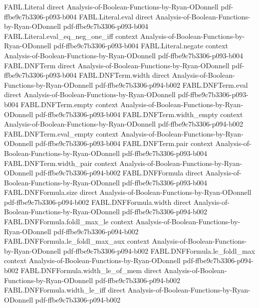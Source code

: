 \begin{theorem}
\proofstep
  {FABL.Literal}
  {direct}
  {Analysis-of-Boolean-Functions-by-Ryan-ODonnell}
  {pdf-ffbe9c7b3306-p093-b004}
\proofstep
  {FABL.Literal.eval}
  {direct}
  {Analysis-of-Boolean-Functions-by-Ryan-ODonnell}
  {pdf-ffbe9c7b3306-p093-b004}
\proofstep
  {FABL.Literal.eval_eq_neg_one_iff}
  {context}
  {Analysis-of-Boolean-Functions-by-Ryan-ODonnell}
  {pdf-ffbe9c7b3306-p093-b004}
\proofstep
  {FABL.Literal.negate}
  {context}
  {Analysis-of-Boolean-Functions-by-Ryan-ODonnell}
  {pdf-ffbe9c7b3306-p093-b004}
\proofstep
  {FABL.DNFTerm}
  {direct}
  {Analysis-of-Boolean-Functions-by-Ryan-ODonnell}
  {pdf-ffbe9c7b3306-p093-b004}
\proofstep
  {FABL.DNFTerm.width}
  {direct}
  {Analysis-of-Boolean-Functions-by-Ryan-ODonnell}
  {pdf-ffbe9c7b3306-p094-b002}
\proofstep
  {FABL.DNFTerm.eval}
  {direct}
  {Analysis-of-Boolean-Functions-by-Ryan-ODonnell}
  {pdf-ffbe9c7b3306-p093-b004}
\proofstep
  {FABL.DNFTerm.empty}
  {context}
  {Analysis-of-Boolean-Functions-by-Ryan-ODonnell}
  {pdf-ffbe9c7b3306-p093-b004}
\proofstep
  {FABL.DNFTerm.width_empty}
  {context}
  {Analysis-of-Boolean-Functions-by-Ryan-ODonnell}
  {pdf-ffbe9c7b3306-p094-b002}
\proofstep
  {FABL.DNFTerm.eval_empty}
  {context}
  {Analysis-of-Boolean-Functions-by-Ryan-ODonnell}
  {pdf-ffbe9c7b3306-p093-b004}
\proofstep
  {FABL.DNFTerm.pair}
  {context}
  {Analysis-of-Boolean-Functions-by-Ryan-ODonnell}
  {pdf-ffbe9c7b3306-p093-b004}
\proofstep
  {FABL.DNFTerm.width_pair}
  {context}
  {Analysis-of-Boolean-Functions-by-Ryan-ODonnell}
  {pdf-ffbe9c7b3306-p094-b002}
\proofstep
  {FABL.DNFFormula}
  {direct}
  {Analysis-of-Boolean-Functions-by-Ryan-ODonnell}
  {pdf-ffbe9c7b3306-p093-b004}
\proofstep
  {FABL.DNFFormula.size}
  {direct}
  {Analysis-of-Boolean-Functions-by-Ryan-ODonnell}
  {pdf-ffbe9c7b3306-p094-b002}
\proofstep
  {FABL.DNFFormula.width}
  {direct}
  {Analysis-of-Boolean-Functions-by-Ryan-ODonnell}
  {pdf-ffbe9c7b3306-p094-b002}
\proofstep
  {FABL.DNFFormula.foldl_max_le}
  {context}
  {Analysis-of-Boolean-Functions-by-Ryan-ODonnell}
  {pdf-ffbe9c7b3306-p094-b002}
\proofstep
  {FABL.DNFFormula.le_foldl_max_aux}
  {context}
  {Analysis-of-Boolean-Functions-by-Ryan-ODonnell}
  {pdf-ffbe9c7b3306-p094-b002}
\proofstep
  {FABL.DNFFormula.le_foldl_max}
  {context}
  {Analysis-of-Boolean-Functions-by-Ryan-ODonnell}
  {pdf-ffbe9c7b3306-p094-b002}
\proofstep
  {FABL.DNFFormula.width_le_of_mem}
  {direct}
  {Analysis-of-Boolean-Functions-by-Ryan-ODonnell}
  {pdf-ffbe9c7b3306-p094-b002}
\proofstep
  {FABL.DNFFormula.width_le_iff}
  {direct}
  {Analysis-of-Boolean-Functions-by-Ryan-ODonnell}
  {pdf-ffbe9c7b3306-p094-b002}

\end{theorem}
